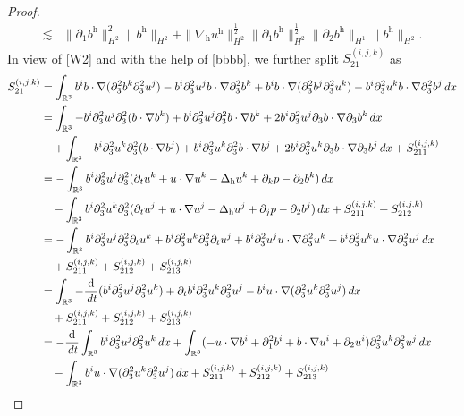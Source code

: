 \documentclass[10pt,a4paper]{amsart}
\newcommand{\R}{\mathbb{R}}
\newcommand{\dt}{\,{\rm d}t}
\newcommand{\dx}{\,{\rm d}x}
\newcommand{\h}{\mathrm{h}}
\newcommand{\nablah}{\nabla_{\mathrm{h}}}
\begin{document}
\begin{proof}
\begin{align}
		\lesssim&\|\partial_1b^\h\|_{H^2}^2\|b^\h\|_{H^2}+\|\nablah u^\h\|_{H^2}^\frac12\|\partial_1b^\h\|_{H^2}^\frac12\|\partial_2b^\h\|_{H^1}\|b^\h\|_{H^2}.
	\end{align}
	In view of \eqref{W2} and with the help of \eqref{bbbb}, we further split $S^{(i,j,k)}_{21}$ as
	\begin{align}\label{S21deco}
		S^{(i,j,k)}_{21}&=\int_{\R^3} b^ib\cdot\nabla (\partial_3^2b^k\partial_3^2u^j)-b^i\partial_3^2u^jb\cdot\nabla \partial_3^2b^k+ b^ib\cdot\nabla (\partial_3^2b^j\partial_3^2u^k)-b^i\partial_3^2u^kb\cdot\nabla \partial_3^2b^j\dx\nonumber\\
		&=\int_{\R^3}-b^i\partial_3^2u^j\partial_3^2(b\cdot\nabla b^k)+b^i\partial_3^2u^j\partial_3^2b\cdot\nabla b^k+2b^i\partial_3^2u^j\partial_3b\cdot\nabla \partial_3b^k\dx\nonumber\\
		&\quad+\int_{\R^3}-b^i\partial_3^2u^k\partial_3^2(b\cdot\nabla b^j)+b^i\partial_3^2u^k\partial_3^2b\cdot\nabla b^j+2b^i\partial_3^2u^k\partial_3b\cdot\nabla \partial_3b^j\dx+S^{(i,j,k)}_{211}\nonumber\\
		&=-\int_{\R^3}b^i\partial_3^2u^j\partial_3^2(\partial_tu^k+u\cdot \nabla u^k-\Delta_\h u^k+\partial_kp-\partial_2b^k)\dx\nonumber\\
		&\quad-\int_{\R^3}b^i\partial_3^2u^k\partial_3^2(\partial_tu^j+u\cdot \nabla u^j-\Delta_\h u^j+\partial_jp-\partial_2b^j)\dx+S^{(i,j,k)}_{211}+S^{(i,j,k)}_{212}\nonumber\\
		&=-\int_{\R^3}b^i\partial_3^2u^j\partial_3^2\partial_tu^k+b^i\partial_3^2u^k\partial_3^2\partial_tu^j+b^i\partial_3^2u^j u\cdot \nabla \partial_3^2u^k+b^i\partial_3^2u^k u\cdot \nabla \partial_3^2u^j\dx\nonumber\\
		&\quad+S^{(i,j,k)}_{211}+S^{(i,j,k)}_{212}+S^{(i,j,k)}_{213}\nonumber\\
		&=\int_{\R^3}-\frac{\mathrm{d}}{\dt}(b^i\partial_3^2u^j\partial_3^2u^k)+\partial_tb^i\partial_3^2u^k\partial_3^2u^j-b^i u\cdot \nabla (\partial_3^2u^k\partial_3^2u^j)\dx\nonumber\\
		&\quad+S^{(i,j,k)}_{211}+S^{(i,j,k)}_{212}+S^{(i,j,k)}_{213}\nonumber\\
		& =-\frac{\mathrm{d}}{\dt}\int_{\R^3}b^i\partial_3^2u^j\partial_3^2u^k\dx+\int_{\R^3}(-u\cdot\nabla b^i+\partial_1^2b^i+b\cdot\nabla u^i+\partial_2u^i)	\partial_3^2u^k\partial_3^2u^j\dx\nonumber\\
		&\quad -\int_{\R^3}b^i u\cdot \nabla (\partial_3^2u^k\partial_3^2u^j)\dx+S^{(i,j,k)}_{211}+S^{(i,j,k)}_{212}+S^{(i,j,k)}_{213}\nonumber\\

\end{align}
\end{proof}
\end{document}

